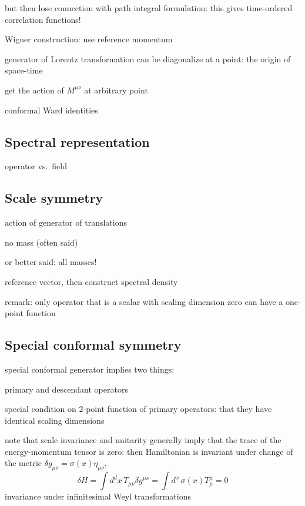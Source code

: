 \documentclass[a4paper,12pt]{article}
\numberwithin{equation}{section}
\begin{document}
but then lose connection with path integral formulation: this gives time-ordered correlation functions!




Wigner construction: use reference momentum


generator of Lorentz transformation can be diagonalize at a point: the origin of space-time

get the action of $M^{\mu\nu}$ at arbitrary point



conformal Ward identities



\subsection{Spectral representation}

operator vs.~field

\subsection{Scale symmetry}

action of generator of translations

no mass (often said)

or better said: all masses!

reference vector, then construct spectral density


remark: only operator that is a scalar with scaling dimension zero can have a one-point function



\subsection{Special conformal symmetry}

special conformal generator implies two things:

primary and descendant operators

special condition on 2-point function of primary operators: that they have identical scaling dimensions



note that scale invariance and unitarity generally imply that the trace of the energy-momentum tensor is zero: then Hamiltonian is invariant under change of the metric $\delta g_{\mu\nu} = \sigma(x) \eta_{\mu\nu}$,
\begin{equation}
	\delta H = \int d^dx \, T_{\mu\nu} \delta g^{\mu\nu}
	= \int d^x \, \sigma(x) T^\mu_\mu = 0
\end{equation}
invariance under infinitesimal Weyl transformations 
\end{document}
